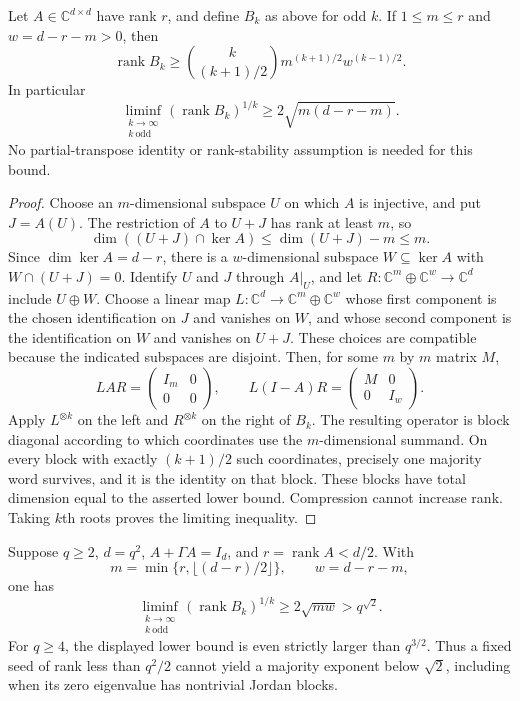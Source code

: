 \begin{lemma}
\label{lem:majority-compression}
Let $A\in\mathbb C^{d\times d}$ have rank $r$, and define $B_k$ as
above for odd $k$. If $1\le m\le r$ and $w=d-r-m>0$, then
\[
 \operatorname{rank}B_k\ge
 \binom{k}{(k+1)/2}m^{(k+1)/2}w^{(k-1)/2}.
\]
In particular
\[
 \liminf_{\substack{k\to\infty\\k\ \text{odd}}}
       (\operatorname{rank}B_k)^{1/k}\ge2\sqrt{m(d-r-m)}.
\]
No partial-transpose identity or rank-stability assumption is needed
for this bound.
\end{lemma}

\begin{proof}
Choose an $m$-dimensional subspace $U$ on which $A$ is injective,
and put $J=A(U)$. The restriction of $A$ to $U+J$ has rank at least
$m$, so
\[
 \dim((U+J)\cap\ker A)\le\dim(U+J)-m\le m.
\]
Since $\dim\ker A=d-r$, there is a $w$-dimensional subspace
$W\subseteq\ker A$ with $W\cap(U+J)=0$.
Identify $U$ and $J$ through $A|_U$, and let
$R:\mathbb C^m\oplus\mathbb C^w\longrightarrow\mathbb C^d$
include $U\oplus W$.
Choose a linear map
$L:\mathbb C^d\longrightarrow\mathbb C^m\oplus\mathbb C^w$
whose first component is the chosen identification on $J$ and
vanishes on $W$, and whose second component is the identification
on $W$ and vanishes on $U+J$. These choices are compatible because
the indicated subspaces are disjoint. Then, for some $m$ by $m$
matrix $M$,
\[
 LAR=\begin{pmatrix}I_m&0\\0&0\end{pmatrix},\qquad
 L(I-A)R=\begin{pmatrix}M&0\\0&I_w\end{pmatrix}.
\]
Apply $L^{\otimes k}$ on the left and $R^{\otimes k}$ on the
right of $B_k$. The resulting operator is block diagonal according
to which coordinates use the $m$-dimensional summand. On every
block with exactly $(k+1)/2$ such coordinates, precisely one
majority word survives, and it is the identity on that block.
These blocks have total dimension equal to the asserted lower
bound. Compression cannot increase rank. Taking $k$th roots proves
the limiting inequality.
\end{proof}

\begin{corollary}
\label{cor:majority-jordan-barrier}
Suppose $q\ge2$, $d=q^2$, $A+\Gamma A=I_d$, and
$r=\operatorname{rank}A<d/2$. With
\[
 m=\min\{r,\lfloor(d-r)/2\rfloor\},\qquad w=d-r-m,
\]
one has
\[
 \liminf_{\substack{k\to\infty\\k\ \text{odd}}}
       (\operatorname{rank}B_k)^{1/k}
       \ge2\sqrt{mw}>q^{\sqrt2}.
\]
For $q\ge4$, the displayed lower bound is even strictly larger than
$q^{3/2}$. Thus a fixed seed of rank less than $q^2/2$ cannot yield
a majority exponent below $\sqrt2$, including when its zero
eigenvalue has nontrivial Jordan blocks.
\end{corollary}

